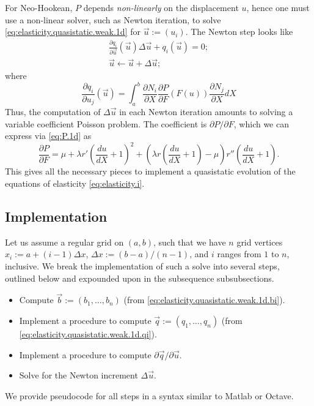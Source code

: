 For Neo-Hookean, $P$ depends \emph{non-linearly} on the displacement $u$, hence one must use a non-linear solver, such as Newton iteration, to solve \eqref{eq:elasticity.quasistatic.weak.1d} for $\vec{u} := \left( u_i \right)$. The Newton step looks like
\begin{gather*}
\frac{\partial q_i}{\partial\vec{u}} \left( \vec{u} \right) \Delta \vec{u} + q_i \left( \vec{u} \right) = 0; \\
\vec{u} \leftarrow \vec{u} + \Delta \vec{u};
\end{gather*}
where
\begin{equation*}
\frac{\partial q_i}{\partial u_j} \left( \vec{u} \right) = \int_a^b \frac{\partial N_i}{\partial X} \frac{\partial P}{\partial F} \left( F(u) \right) \frac{\partial N_j}{\partial X} dX
\end{equation*}
Thus, the computation of $\Delta \vec{u}$ in each Newton iteration amounts to solving a variable coefficient Poisson problem. The coefficient is $\partial P/\partial F$, which we can express via \eqref{eq:P.1d} as
\begin{equation*}
\frac{\partial P}{\partial F} = \mu + \lambda r' \left( \frac{du}{dX} + 1 \right)^2 + \left( \lambda r \left( \frac{du}{dX} + 1 \right) - \mu \right) r'' \left( \frac{du}{dX} + 1 \right).
\end{equation*}
This gives all the necessary pieces to implement a quasistatic evolution of the equations of elasticity \eqref{eq:elasticity.i}.

\subsection{Implementation}

Let us assume a regular grid on $(a,b)$, such that we have $n$ grid vertices $x_i := a + (i - 1) \Delta x$, $\Delta x := (b - a)/(n - 1)$, and $i$ ranges from $1$ to $n$, inclusive. We break the implementation of such a solve into several steps, outlined below and expounded upon in the subsequence subsubsections.
\begin{itemize}
\item Compute $\vec{b} := \left( b_1, \dotsc, b_n \right)$ (from \eqref{eq:elasticity.quasistatic.weak.1d.bi}).
\item Implement a procedure to compute $\vec{q} := \left( q_1, \dotsc, q_n \right)$ (from \eqref{eq:elasticity.quasistatic.weak.1d.qi}).
\item Implement a procedure to compute $\partial\vec{q}/\partial\vec{u}$.
\item Solve for the Newton increment $\Delta \vec{u}$.
\end{itemize}
We provide pseudocode for all steps in a syntax similar to Matlab or Octave.

